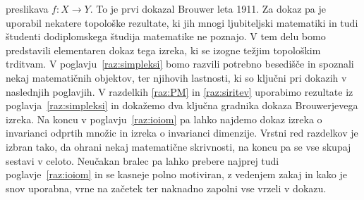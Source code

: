 \documentclass[mat1]{fmfdelo}
\newcommand{\0}{\underline{0}}
\begin{document}
preslikava $f : X \to Y$. To je prvi dokazal Brouwer leta 1911. Za dokaz pa je uporabil nekatere topološke rezultate, ki jih mnogi ljubiteljski matematiki in tudi študenti dodiplomskega študija matematike ne poznajo. 
V tem delu bomo predstavili elementaren dokaz tega izreka, ki se izogne težjim topološkim trditvam. V poglavju~\ref{raz:simpleksi} bomo razvili potrebno besedišče in spoznali nekaj matematičnih objektov, ter njihovih lastnosti, ki so ključni pri dokazih v naslednjih poglavjih.  V razdelkih \ref{raz:PM} in \ref{raz:siritev} uporabimo rezultate iz poglavja~\ref{raz:simpleksi} in dokažemo dva ključna gradnika dokaza Brouwerjevega izreka. Na koncu v poglavju~\ref{raz:ioiom} pa lahko najdemo dokaz izreka o invarianci odprtih množic in izreka o invarianci dimenzije. Vrstni red razdelkov je izbran tako, da ohrani nekaj matematične skrivnosti, na koncu pa se vse skupaj sestavi v celoto. Neučakan bralec pa lahko prebere najprej tudi poglavje~\ref{raz:ioiom} in se kasneje polno motiviran, z vedenjem zakaj in kako je snov uporabna, vrne na začetek ter naknadno zapolni vse vrzeli v dokazu.


\end{document}
